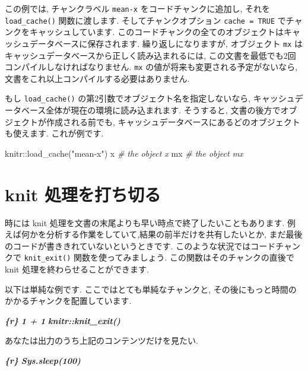 \documentclass[
  11pt,
  lualatex,
  ja=standard]{bxjsreport}
\newenvironment{Shaded}{\begin{snugshade}}{\end{snugshade}}
\newcommand{\CommentTok}[1]{\textcolor[rgb]{0.56,0.35,0.01}{\textit{#1}}}
\newcommand{\FunctionTok}[1]{\textcolor[rgb]{0.00,0.00,0.00}{#1}}
\newcommand{\InformationTok}[1]{\textcolor[rgb]{0.56,0.35,0.01}{\textbf{\textit{#1}}}}
\newcommand{\NormalTok}[1]{#1}
\newcommand{\SpecialCharTok}[1]{\textcolor[rgb]{0.00,0.00,0.00}{#1}}
\newcommand{\StringTok}[1]{\textcolor[rgb]{0.31,0.60,0.02}{#1}}
\begin{document}
この例では, チャンクラベル \texttt{mean-x} をコードチャンクに追加し, それを \texttt{load\_cache()} 関数に渡します. そしてチャンクオプション \texttt{cache = TRUE} でチャンクをキャッシュしています. このコードチャンクの全てのオブジェクトはキャッシュデータベースに保存されます. 繰り返しになりますが, オブジェクト \texttt{mx} はキャッシュデータベースから正しく読み込まれるには, この文書を最低でも2回コンパイルしなければなりません. \texttt{mx} の値が将来も変更される予定がないなら, 文書をこれ以上コンパイルする必要はありません.

もし \texttt{load\_cache()} の第2引数でオブジェクト名を指定しないなら, キャッシュデータベース全体が現在の環境に読み込まれます. そうすると, 文書の後方でオブジェクトが作成される前でも, キャッシュデータベースにあるどのオブジェクトも使えます. これが例です.

\begin{Shaded}
\begin{Highlighting}[numbers=left,,]
\NormalTok{knitr}\SpecialCharTok{::}\FunctionTok{load\_cache}\NormalTok{(}\StringTok{"mean{-}x"}\NormalTok{)}
\NormalTok{x  }\CommentTok{\# the object \textasciigrave{}x\textasciigrave{}}
\NormalTok{mx  }\CommentTok{\# the object \textasciigrave{}mx\textasciigrave{}}
\end{Highlighting}
\end{Shaded}

\hypertarget{knit-exit}{%
\section{knit 処理を打ち切る}\label{knit-exit}}

時には knit 処理を文書の末尾よりも早い時点で終了したいこともあります. 例えば何かを分析する作業をしていて,結果の前半だけを共有したいとか, まだ最後のコードが書ききれていないというときです. このような状況ではコードチャンクで \texttt{knit\_exit()} 関数を使ってみましょう. この関数はそのチャンクの直後で knit 処理を終わらせることができます.

以下は単純な例です. ここではとても単純なチャンクと, その後にもっと時間のかかるチャンクを配置しています.

\begin{Shaded}
\begin{Highlighting}[]
\InformationTok{\textasciigrave{}\textasciigrave{}\textasciigrave{}\{r\}}
\InformationTok{1 + 1}
\InformationTok{knitr::knit\_exit()}
\InformationTok{\textasciigrave{}\textasciigrave{}\textasciigrave{}}

\NormalTok{あなたは出力のうち上記のコンテンツだけを見たい.}

\InformationTok{\textasciigrave{}\textasciigrave{}\textasciigrave{}\{r\}}
\InformationTok{Sys.sleep(100)}
\InformationTok{\textasciigrave{}\textasciigrave{}\textasciigrave{}}
\end{Highlighting}
\end{Shaded}
\end{document}
